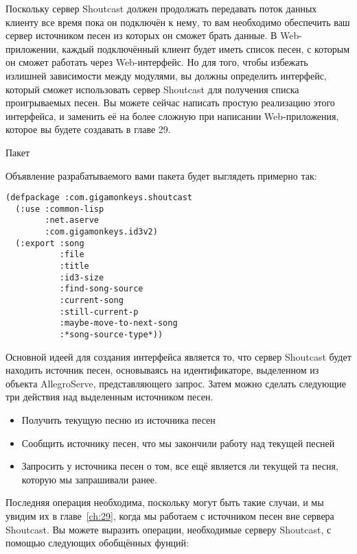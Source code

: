 Поскольку сервер Shoutcast должен продолжать передавать поток данных клиенту все время
пока он подключён к нему, то вам необходимо обеспечить ваш сервер источником песен из
которых он сможет брать данные.  В Web-приложении, каждый подключённый клиент будет иметь
список песен, с которым он сможет работать через Web-интерфейс.  Но для того, чтобы
избежать излишней зависимости между модулями, вы должны определить интерфейс, который
сможет использовать сервер Shoutcast для получения списка проигрываемых песен. Вы можете
сейчас написать простую реализацию этого интерфейса, и заменить её на более сложную при
написании Web-приложения, которое вы будете создавать в главе 29.


Пакет

Объявление разрабатываемого вами пакета будет выглядеть примерно так:

\begin{lstlisting}
(defpackage :com.gigamonkeys.shoutcast
  (:use :common-lisp 
        :net.aserve 
        :com.gigamonkeys.id3v2)
  (:export :song
           :file
           :title
           :id3-size
           :find-song-source
           :current-song
           :still-current-p
           :maybe-move-to-next-song
           :*song-source-type*))
\end{lstlisting}


Основной идеей для создания интерфейса является то, что сервер Shoutcast будет находить
источник песен, основываясь на идентификаторе, выделенном из объекта AllegroServe,
представляющего запрос.  Затем можно сделать следующие три действия над выделенным
источником песен.

\begin{itemize}
\item Получить текущую песню из источника песен
\item Сообщить источнику песен, что мы закончили работу над текущей песней
\item Запросить у источника песен о том, все ещё является ли текущей та песня, которую мы
  запрашивали ранее.
\end{itemize}

Последняя операция необходима, поскольку могут быть такие случаи, и мы увидим их в
главе~\ref{ch:29}, когда мы работаем с источником песен вне сервера Shoutcast.  Вы можете
выразить операции, необходимые серверу Shoutcast, с помощью следующих обобщённых фунций:

